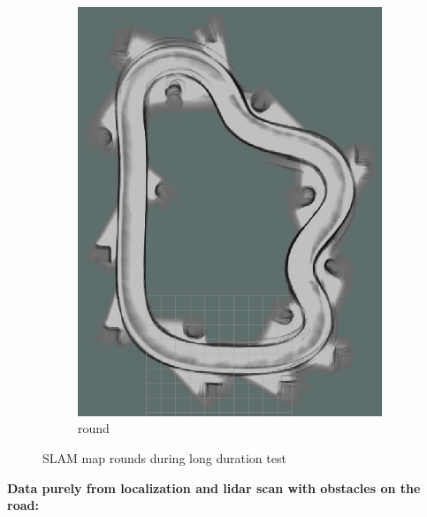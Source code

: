 \begin{figure}
\begin{subfigure}{.3\linewidth}
		\includegraphics[width=\textwidth]{Pictures/2slamtest7}
		\caption{ round}
	\end{subfigure}

	\caption{SLAM map rounds during long duration test}
	\label{3slamtest}

\end{figure}


\textbf{Data purely from localization and lidar scan with obstacles on the road:}\\

